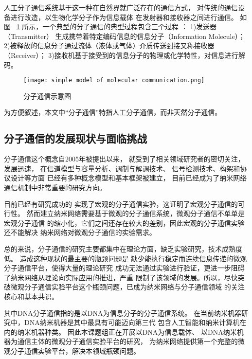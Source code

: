 人工分子通信系统基于这一种在自然界就广泛存在的通信方式，
对传统的通信设备进行改造，以生物化学分子作为信息载体
在发射器和接收器之间进行通信。
如图
~\ref{fig:molecular_communication_example}
所示，一个典型的分子通信的典型过程包含三个过程
\cite{基于扩散的分子通信与身体域纳米网络}：
1)发送器（Transmitter）
生成携带着特定编码信息的信息分子（Information Molecule）；
2)被释放的信息分子通过流体（液体或气体）介质传送到接又称接收器（Receiver）；
3)接收机基于接受到的信息分子的物理或化学特性，对信息进行解码。
\begin{figure}[H]
    \centering
    \texttt{[image: simple model of molecular communication.png]}
    \caption{分子通信示意图\cite{compic}}
    \label{fig:molecular_communication_example}
\end{figure}

为方便叙述，本文中“分子通信”特指人工分子通信，而非天然分子通信。

\subsection{分子通信的发展现状与面临挑战}
分子通信这个概念自2005年被提出以来\cite{Suda05exploratoryresearch}，
就受到了相关领域研究者的密切关注，发展迅速，
在信道模型与容量分析、调制与解调技术、
信号检测技术、构架和协议设计等方面
已经有多种概念模型和基本框架被建立，
目前已经成为了纳米网络通信机制中非常重要的研究方向。

目前已经有研究成功的
实现了宏观的分子通信实验\cite{10.1007/978-81-322-1007-8_56}，这证明了宏观分子通信的可行性。
然而建立纳米网络需要基于微观的分子通信系统，微观分子通信不单单是宏观分子通信
的缩小化，它们之间还存在较大的差别，因此宏观的分子通信实验还不能解决
纳米网络对微观分子通信的实验需求。

总的来说，分子通信的研究主要都集中在理论方面，缺乏实验研究，技术成熟度低。
造成这种现状的最主要的瓶颈问题是
缺少能执行稳定而连续信息传递的微观分子通信平台，使得大量的理论研究
成功无法通过实验进行验证，更进一步阻碍了纳米网络从理论向实际应用的推进，严重
限制了该领域的发展。所以，尽快突破微观分子通信实验平台这个瓶颈问题，已成为纳米网络与分子通信领域
的关注核心和基本共识\cite{Liu1999}。

其中DNA分子通信指的是以DNA为信息分子的分子通信系统。
在当前纳米机器研究中，DNA纳米机器是其中最具有可能迈向第三代
包含人工智能和纳米计算机在内的纳米机器种类\cite{McCutcheon2017}。
因此本课题组正在开展以DNA为信息载体、
以DNA纳米机器为通信主体的微观分子通信实验平台的研究，
为纳米网络提供第一个完整的微观分子通信实验平台，解决本领域瓶颈问题。


